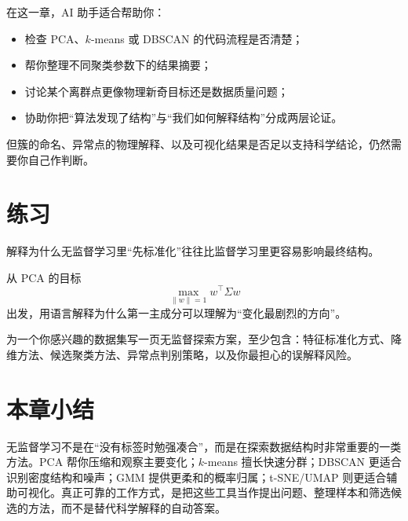 在这一章，AI 助手适合帮助你：

\begin{itemize}
    \item 检查 PCA、$k$-means 或 DBSCAN 的代码流程是否清楚；
    \item 帮你整理不同聚类参数下的结果摘要；
    \item 讨论某个离群点更像物理新奇目标还是数据质量问题；
    \item 协助你把“算法发现了结构”与“我们如何解释结构”分成两层论证。
\end{itemize}

但簇的命名、异常点的物理解释、以及可视化结果是否足以支持科学结论，仍然需要你自己作判断。

\section{练习}

\begin{exercisebox}[基础练习]
解释为什么无监督学习里“先标准化”往往比监督学习里更容易影响最终结构。
\end{exercisebox}

\begin{exercisebox}[进阶练习]
从 PCA 的目标
\[
\max_{\|w\|=1} w^\top \Sigma w
\]
出发，用语言解释为什么第一主成分可以理解为“变化最剧烈的方向”。
\end{exercisebox}

\begin{exercisebox}[开放练习]
为一个你感兴趣的数据集写一页无监督探索方案，至少包含：特征标准化方式、降维方法、候选聚类方法、异常点判别策略，以及你最担心的误解释风险。
\end{exercisebox}

\section{本章小结}

无监督学习不是在“没有标签时勉强凑合”，而是在探索数据结构时非常重要的一类方法。PCA 帮你压缩和观察主要变化；$k$-means 擅长快速分群；DBSCAN 更适合识别密度结构和噪声；GMM 提供更柔和的概率归属；t-SNE/UMAP 则更适合辅助可视化。真正可靠的工作方式，是把这些工具当作提出问题、整理样本和筛选候选的方法，而不是替代科学解释的自动答案。
